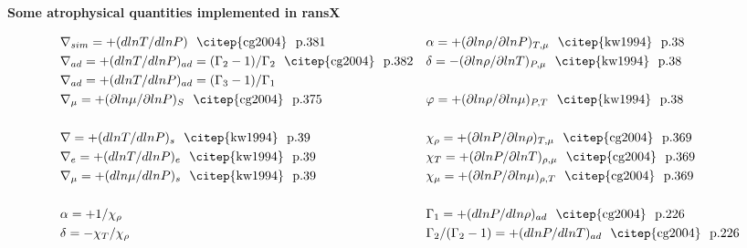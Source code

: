 \documentclass[12pt,paper=a4]{report}
\begin{document}



\newpage

{\centerline {{\bf Some atrophysical quantities implemented in ransX}}}

\vspace{0.2cm}

\begin{table}[!h]
\label{tab:rans-cont}
\begin{align}                                                      
& \nabla_{sim} = +(d ln T/d ln P) \ \ \mbox{\citep{cg2004} \ p.381}  & & \alpha = +(\partial ln \rho/\partial ln P)_{T,\mu} \ \ \mbox{\citep{kw1994} \ p.38}  \nonumber \\
  & \nabla_{ad} = +(d ln T/d ln P)_{ad} = (\Gamma_2 -1)/\Gamma_2 \ \ \mbox{\citep{cg2004} \ p.382} & & \delta = -(\partial ln \rho/\partial ln T)_{P,\mu}  \ \ \mbox{\citep{kw1994} \ p.38} \nonumber \\
& \nabla_{ad} = +(d ln T/d ln P)_{ad} = (\Gamma_3 -1)/\Gamma_1 \ \ & & \nonumber \\   
& \nabla_{\mu} = +(\partial ln \mu/\partial ln P)_{S}  \ \ \mbox{\citep{cg2004} \ p.375}   & & \varphi = +(\partial ln \rho/\partial ln \mu)_{P,T} \ \ \mbox{\citep{kw1994} \ p.38} \nonumber \\
  & & & \nonumber \\
& \nabla = +(d ln T/d ln P)_s \ \ \mbox{\citep{kw1994} \ p.39}  & & \chi_\rho = +(\partial ln P/\partial ln \rho)_{T,\mu} \ \ \mbox{\citep{cg2004} \ p.369} \nonumber \\
& \nabla_{e} = +(d ln T/d ln P)_e \ \ \mbox{\citep{kw1994} \ p.39} & & \chi_T = +(\partial ln P/\partial ln T)_{\rho,\mu} \ \ \mbox{\citep{cg2004} \ p.369} \nonumber \\ 
& \nabla_{\mu} = +(d ln \mu/d ln P)_s  \ \ \mbox{\citep{kw1994} \ p.39} & & \chi_\mu = +(\partial ln P/\partial ln \mu)_{\rho,T} \ \ \mbox{\citep{cg2004} \ p.369} \nonumber \\
  & & & \nonumber \\
  & \alpha = +1/\chi_\rho  & & \Gamma_1 = +(d ln P/d ln \rho)_{ad} \ \ \mbox{\citep{cg2004} \ p.226} \nonumber \\
  & \delta = -\chi_T/\chi_\rho  & & \Gamma_2 /(\Gamma_2 -1) = +(d ln P/d ln T)_{ad}  \ \ \mbox{\citep{cg2004} \ p.226} \nonumber \\

\end{align}
\end{table}
\end{document}
